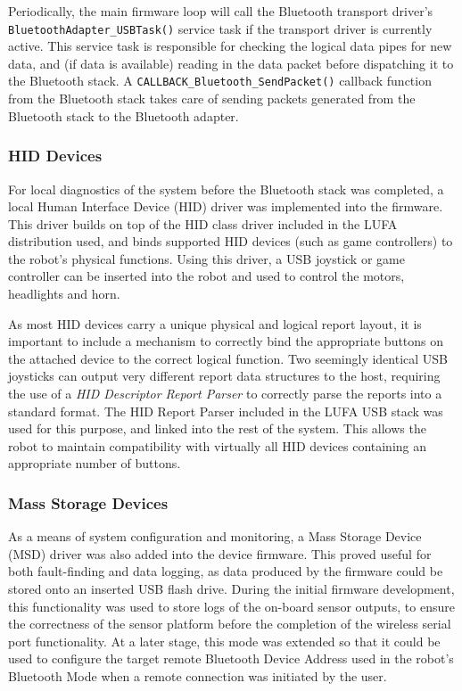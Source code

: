 Periodically, the main firmware loop will call the Bluetooth transport driver's \\ \lstinline{BluetoothAdapter_USBTask()} service task if the transport driver is currently active. This service task is responsible for checking the logical data pipes for new data, and (if data is available) reading in the data packet before dispatching it to the Bluetooth stack. A \lstinline{CALLBACK_Bluetooth_SendPacket()} callback function from the Bluetooth stack takes care of sending packets generated from the Bluetooth stack to the Bluetooth adapter.

\FloatBarrier
\subsubsection{HID Devices}

For local diagnostics of the system before the Bluetooth stack was completed, a local Human Interface Device (HID) driver was implemented into the firmware. This driver builds on top of the HID class driver included in the LUFA distribution used, and binds supported HID devices (such as game controllers) to the robot's physical functions. Using this driver, a USB joystick or game controller can be inserted into the robot and used to control the motors, headlights and horn.

As most HID devices carry a unique physical and logical report layout, it is important to include a mechanism to correctly bind the appropriate buttons on the attached device to the correct logical function. Two seemingly identical USB joysticks can output very different report data structures to the host, requiring the use of a \textit{HID Descriptor Report Parser} to correctly parse the reports into a standard format. The HID Report Parser included in the LUFA USB stack was used for this purpose, and linked into the rest of the system. This allows the robot to maintain compatibility with virtually all HID devices containing an appropriate number of buttons.

\FloatBarrier
\subsubsection{Mass Storage Devices}

As a means of system configuration and monitoring, a Mass Storage Device (MSD) driver was also added into the device firmware. This proved useful for both fault-finding and data logging, as data produced by the firmware could be stored onto an inserted USB flash drive. During the initial firmware development, this functionality was used to store logs of the on-board sensor outputs, to ensure the correctness of the sensor platform before the completion of the wireless serial port functionality. At a later stage, this mode was extended so that it could be used to configure the target remote Bluetooth Device Address used in the robot's Bluetooth Mode when a remote connection was initiated by the user.

